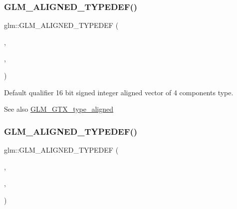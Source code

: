 \subsubsection{\texorpdfstring{G\+L\+M\+\_\+\+A\+L\+I\+G\+N\+E\+D\+\_\+\+T\+Y\+P\+E\+D\+E\+F()}{GLM\_ALIGNED\_TYPEDEF()}\hspace{0.1cm}{\footnotesize\ttfamily [60/209]}}
{\footnotesize\ttfamily glm\+::\+G\+L\+M\+\_\+\+A\+L\+I\+G\+N\+E\+D\+\_\+\+T\+Y\+P\+E\+D\+EF (\begin{DoxyParamCaption}\item[{\mbox{\hyperlink{group__gtc__type__precision_ga99a249a4cc129cb527c48d3afd38b666}{i16vec4}}}]{,  }\item[{aligned\+\_\+i16vec4}]{,  }\item[{8}]{ }\end{DoxyParamCaption})}

Default qualifier 16 bit signed integer aligned vector of 4 components type. \begin{DoxySeeAlso}{See also}
\mbox{\hyperlink{group__gtx__type__aligned}{G\+L\+M\+\_\+\+G\+T\+X\+\_\+type\+\_\+aligned}} 
\end{DoxySeeAlso}
\mbox{\label{group__gtx__type__aligned_ga904e9c2436bb099397c0823506a0771f}} 
\subsubsection{\texorpdfstring{G\+L\+M\+\_\+\+A\+L\+I\+G\+N\+E\+D\+\_\+\+T\+Y\+P\+E\+D\+E\+F()}{GLM\_ALIGNED\_TYPEDEF()}\hspace{0.1cm}{\footnotesize\ttfamily [61/209]}}
{\footnotesize\ttfamily glm\+::\+G\+L\+M\+\_\+\+A\+L\+I\+G\+N\+E\+D\+\_\+\+T\+Y\+P\+E\+D\+EF (\begin{DoxyParamCaption}\item[{\mbox{\hyperlink{group__gtc__type__precision_ga97351dd7f0ede9b8b79943f4adcd6a65}{i32vec1}}}]{,  }\item[{aligned\+\_\+i32vec1}]{,  }\item[{4}]{ }\end{DoxyParamCaption})}

